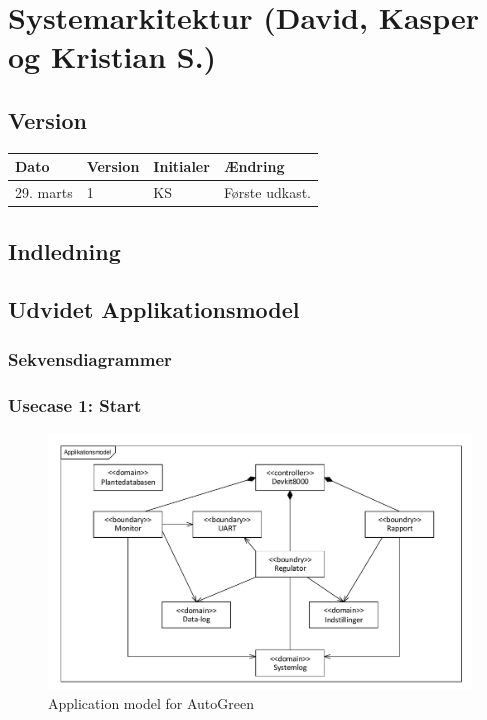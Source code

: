 \chapter{Systemarkitektur (David, Kasper og Kristian S.)}

\section{Version}
\begin{table}[h]
	\centering
	\begin{tabularx}{\textwidth - 2cm}{|l|l|l|X|}
	\hline
	Dato	& Version	& Initialer & Ændring	\\ \hline
	29. marts & 1 & KS & Første udkast. \\ \hline 
	\end{tabularx}
\end{table}

\section{Indledning}

\section{Udvidet Applikationsmodel}

\subsection{Sekvensdiagrammer}

\subsection{Usecase 1: Start}

\begin{figure}[!h]
\centering 
\includegraphics[scale=0.8] {../fig/UML_autogreen.pdf}
\caption{Application model for AutoGreen}
\label{fig:UML}
\end{figure}

